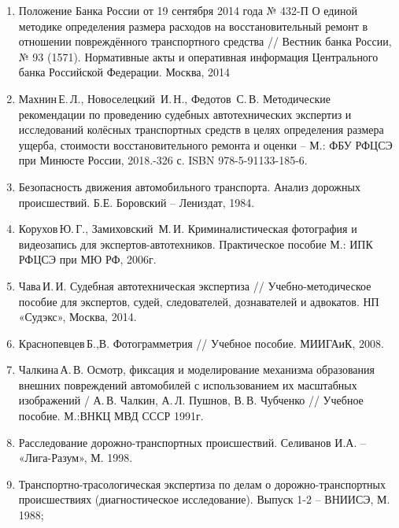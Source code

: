 
%
\begin{enumerate}
\item	
Положение Банка России от 19 сентября 2014 года № 432-П {О единой методике определения размера расходов на восстановительный ремонт в отношении повреждённого транспортного средства} // Вестник банка России, № 93 (1571). Нормативные акты и оперативная информация 	Центрального банка Российской Федерации. Москва, 2014
\item 
Махнин\,Е.\,Л., Новоселецкий\, И.\,Н., Федотов\, С.\,В. Методические рекомендации по проведению судебных автотехнических экспертиз и исследований колёсных транспортных средств в целях определения размера ущерба, стоимости восстановительного ремонта и оценки -- М.: ФБУ РФЦСЭ при Минюсте России, 2018.-326 с.  ISBN 978-5-91133-185-6.
%
%
\item  
Безопасность движения автомобильного транспорта. Анализ дорожных происшествий. Б.Е. Боровский – Лениздат, 1984.
\item 
Корухов\,Ю.\,Г., Замиховский\, М.\,И. Криминалистическая фотография и видеозапись для экспертов-автотехников. Практическое пособие М.: ИПК РФЦСЭ при МЮ РФ, 2006г.
\item 
Чава\,И.\,И. Судебная автотехническая экспертиза // Учебно-методическое пособие для  экспертов,    судей, следователей, дознавателей и адвокатов. НП «Судэкс», Москва, 2014.
\item
Краснопевцев\,Б.,В. Фотограмметрия // Учебное пособие. МИИГАиК, 2008.
\item 
Чалкина\,А.\,В.  Осмотр, фиксация и моделирование механизма образования внешних повреждений автомобилей с использованием их масштабных изображений / А.\,В. Чалкин, А.\,Л. Пушнов, В.\,В. Чубченко // Учебное пособие.  М.:ВНКЦ МВД СССР 1991г.
\item 
Расследование дорожно-транспортных происшествий. Селиванов И.А. – «Лига-Разум», М. 1998.
\item  
Транспортно-трасологическая экспертиза по делам о дорожно-транспортных происшествиях (диагностическое исследование). Выпуск 1-2 – ВНИИСЭ, М. 1988;

\end{enumerate}
